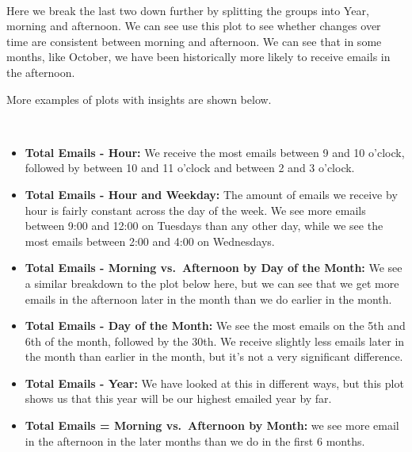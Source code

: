 \documentclass[11pt]{article}
\providecommand{\tightlist}{%
      \setlength{\itemsep}{0pt}\setlength{\parskip}{0pt}}
\begin{document}
    \begin{center}
    \end{center}
    { \hspace*{\fill} \\}
    
    Here we break the last two down further by splitting the groups into
Year, morning and afternoon. We can see use this plot to see whether
changes over time are consistent between morning and afternoon. We can
see that in some months, like October, we have been historically more
likely to receive emails in the afternoon.

    More examples of plots with insights are shown below.

    \begin{center}
    \end{center}
    { \hspace*{\fill} \\}
    
    \begin{itemize}
\tightlist
\item
  \textbf{Total Emails - Hour:} We receive the most emails between 9 and
  10 o'clock, followed by between 10 and 11 o'clock and between 2 and 3
  o'clock.
\item
  \textbf{Total Emails - Hour and Weekday:} The amount of emails we
  receive by hour is fairly constant across the day of the week. We see
  more emails between 9:00 and 12:00 on Tuesdays than any other day,
  while we see the most emails between 2:00 and 4:00 on Wednesdays.
\item
  \textbf{Total Emails - Morning vs.~Afternoon by Day of the Month:} We
  see a similar breakdown to the plot below here, but we can see that we
  get more emails in the afternoon later in the month than we do earlier
  in the month.
\item
  \textbf{Total Emails - Day of the Month:} We see the most emails on
  the 5th and 6th of the month, followed by the 30th. We receive
  slightly less emails later in the month than earlier in the month, but
  it's not a very significant difference.
\item
  \textbf{Total Emails - Year:} We have looked at this in different
  ways, but this plot shows us that this year will be our highest
  emailed year by far.
\item
  \textbf{Total Emails = Morning vs.~Afternoon by Month:} we see more
  email in the afternoon in the later months than we do in the first 6
  months.
\end{itemize}
\end{document}
